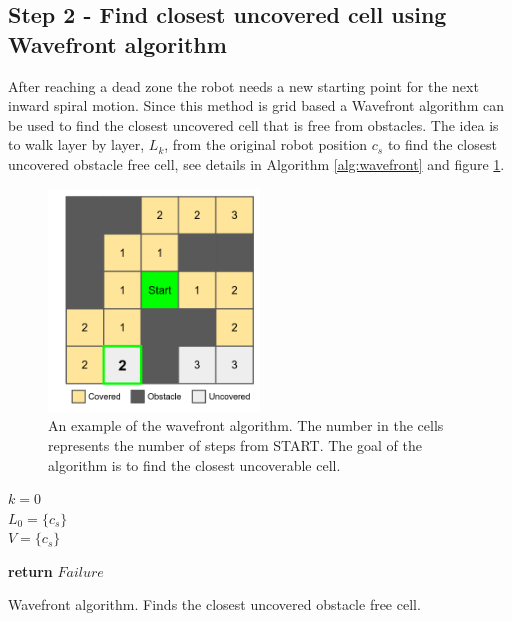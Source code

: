 \subsection{Step 2 - Find closest uncovered cell using Wavefront algorithm}

After reaching a dead zone the robot needs a new starting point for the next inward spiral motion. Since this method is grid based a Wavefront algorithm can be used to find the closest uncovered cell that is free from obstacles. The idea is to walk layer by layer, $L_k$, from the original robot position $c_s$ to find the closest uncovered obstacle free cell, see details in Algorithm \ref{alg:wavefront} and figure \ref{fig:wavefront}.

\begin{figure}
    \centering
    \includegraphics[width=0.5\textwidth]{figures/wavefront.png}
    \caption{An example of the wavefront algorithm. The number in the cells represents the number of steps from START. The goal of the algorithm is to find the closest uncoverable cell.}
    \label{fig:wavefront}
\end{figure}

\begin{algorithm}[H]
\SetAlgoLined
{}
$k=0$ \\
$L_{0} = \{c_s\}$ \\
$V = \{c_s\}$\\

\textup{\textbf{return}} $Failure$

 \caption{Wavefront algorithm. Finds the closest uncovered obstacle free cell.}
 \label{alg:wavefront}
\end{algorithm}

